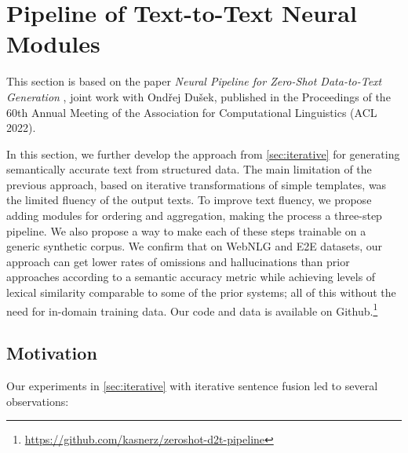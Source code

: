 

\section{Pipeline of Text-to-Text Neural Modules}
\label{sec:pipeline}
\begin{refbox}
    This section is based on the paper \emph{Neural Pipeline for Zero-Shot Data-to-Text Generation} \cite{kasner2022neural}, joint work with Ondřej Dušek, published in the Proceedings of the 60th Annual Meeting of the Association for Computational Linguistics (ACL 2022).
\end{refbox}

In this section, we further develop the approach from \autoref{sec:iterative} for generating semantically accurate text from structured data. The main limitation of the previous approach, based on iterative transformations of simple templates, was the limited fluency of the output texts. To improve text fluency, we propose adding modules for ordering and aggregation, making the process a three-step pipeline. We also propose a way to make each of these steps trainable on a generic synthetic corpus. We confirm that on WebNLG and E2E datasets, our approach can get lower rates of omissions and hallucinations than prior approaches according to a semantic accuracy metric while achieving levels of lexical similarity comparable to some of the prior systems; all of this without the need for in-domain training data. Our code and data is available on Github.\footnote{\url{https://github.com/kasnerz/zeroshot-d2t-pipeline}}


\subsection{Motivation}
Our experiments in \autoref{sec:iterative} with iterative sentence fusion led to several observations:

